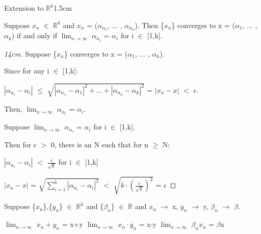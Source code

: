     \begin{ltheorem}{Extension to $\mathbb{R}^k$}{1.5cm}
        \item Suppose $x_n$ $\in$ $\mathbb{R}^k$ and $x_n$
            = ($\alpha_{n_1}$, ... , $\alpha_{n_k}$).
            Then \{$x_n$\} converges to x = ($\alpha_1$, ... , $\alpha_k$)
            if and only if $\lim_{n \rightarrow \infty}$ $\alpha_{n_i}$ = $\alpha_i$
            for i $\in$ [1,k].

            \begin{proof}[14cm]
                Suppose \{$x_n$\} converges to x = ($\alpha_1$, ... , $\alpha_k$).
                
                Since for any i $\in$ [1,k]:

                \hspace{1cm}
                $|\alpha_{n_i} - \alpha_i|$
                $\leq$ $\sqrt{|\alpha_{n_1} - \alpha_1|^2
                                + ... + |\alpha_{n_k} - \alpha_k|^2}$
                = $|x_n - x|$ $<$ $\epsilon$.

                Then, $\lim_{n \rightarrow \infty}$ $\alpha_{n_i}$ = $\alpha_i$.

                \vspace{0.2cm}

                Suppose $\lim_{n \rightarrow \infty}$ $\alpha_{n_i}$ = $\alpha_i$
                for i $\in$ [1,k].
                
                Then for $\epsilon$ $>$ 0, there is an N such that for n $\geq$ N:

                \hspace{1cm}
                $|\alpha_{n_i} - \alpha_i|$ $<$ $\frac{\epsilon}{\sqrt{k}}$
                for i $\in$ [1,k]

                \hspace{1cm}
                $|x_n - x|$
                = $\sqrt{\sum_{i=1}^k |\alpha_{n_i} - \alpha_i|^2}$
                $<$ $\sqrt{k \cdot (\frac{\epsilon}{\sqrt{k}})^2}$
                = $\epsilon$
            \end{proof}

        \item Suppose \{$x_n$\},\{$y_n$\} $\in$ $\mathbb{R}^k$ and
            \{$\beta_n$\} $\in$ $\mathbb{R}$ and $x_n$ $\rightarrow$ x,
            $y_n$ $\rightarrow$ y, $\beta_n$ $\rightarrow$ $\beta$.
            
            $\lim_{n \rightarrow \infty}$ $x_n + y_n$ = x+y
            \hspace{0.5cm}
            $\lim_{n \rightarrow \infty}$ $x_n \cdot y_n$ = x$\cdot$y
            \hspace{0.5cm}
            $\lim_{n \rightarrow \infty}$ $\beta_n x_n$ = $\beta$x


\end{ltheorem}
